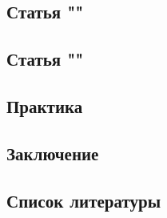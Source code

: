 \documentclass{article}
\begin{document}
    \newpage
    \begin{center} 
    \section{Статья ""}
    \end{center} 
    
    \newpage
    \begin{center} 
    \section{Статья ""}
    \end{center} 
    
    \newpage
    \begin{center} 
    \section{Практика}
    \end{center} 
    
    \newpage
    \begin{center} 
    \section{Заключение}
    \end{center} 
    
    \newpage
    \begin{center} 
    \section{Список литературы}
    \end{center} 
    
\end{document}
